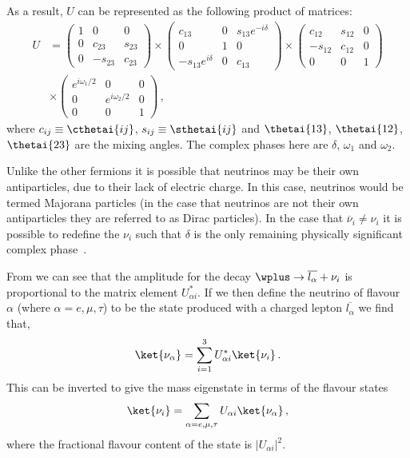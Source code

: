 As a result, $U$ can be represented as the following product of matrices:
\begin{align}
  U &=
  \begin{pmatrix}
    1 & 0       & 0 \\
    0 & c_{23}  & s_{23} \\
    0 & -s_{23} & c_{23}  
  \end{pmatrix}
  \times
  \begin{pmatrix}
    c_{13}             & 0 & s_{13}e^{-i\delta} \\
    0                  & 1 & 0 \\
    -s_{13}e^{i\delta} & 0 & c_{13}
  \end{pmatrix}
  \times
  \begin{pmatrix}
    c_{12}  & s_{12} & 0 \\
    -s_{12} & c_{12} & 0 \\
    0       & 0      & 1
  \end{pmatrix}
  \\
  &\times
  \begin{pmatrix}
    e^{i\omega_{1}/2} & 0                 & 0 \\
    0                 & e^{i\omega_{2}/2} & 0 \\
    0                 & 0                 & 1
  \end{pmatrix} \, ,
\end{align}
where $c_{ij} \equiv \cthetai{ij}$, $s_{ij} \equiv \sthetai{ij}$ and $\thetai{13}$, $\thetai{12}$, $\thetai{23}$ are the mixing angles.
The complex phases here are $\delta$, $\omega_{1}$ and $\omega_{2}$.

Unlike the other fermions it is possible that neutrinos may be their own antiparticles, due to their lack of electric charge.
In this case, neutrinos would be termed Majorana particles (in the case that neutrinos are not their own antiparticles they are referred to as Dirac particles).
In the case that $\overline{\nu}_{i} \neq \nu_{i}$ it is possible to redefine the $\nu_{i}$ such that $\delta$ is the only remaining physically significant complex phase~\cite{cpvMajorana}.

From  we can see that the amplitude for the decay $\wplus \rightarrow \overline{l_{\alpha}} + \nu_{i}$ is proportional to the matrix element $U_{\alpha i}^{*}$.
If we then define the neutrino of flavour $\alpha$ (where $\alpha = e, \mu, \tau$) to be the state produced with a charged lepton $\overline{l_{\alpha}}$ we find that,
\begin{equation}
  \ket{\nu_{\alpha}} = \sum_{i=1}^{3} U^{*}_{\alpha i} \ket{\nu_{i}} \, .
\end{equation}
This can be inverted to give the mass eigenstate in terms of the flavour states
\begin{equation}
  \ket{\nu_{i}} = \sum_{\alpha=e, \mu, \tau} U_{\alpha i} \ket{\nu_{\alpha}} \, ,
\end{equation}
where the fractional flavour content of the state is $|U_{\alpha i}|^{2}$.

